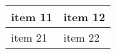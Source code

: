 \documentclass[14pt]{extarticle}
\begin{document}
\begin{tabu} to 1\textwidth { | X[l] | X[] |}
 \hline
 item 11 & item 12\\
 \hline
 item 21  & item 22\\
\hline
\end{tabu}
\end{document}
